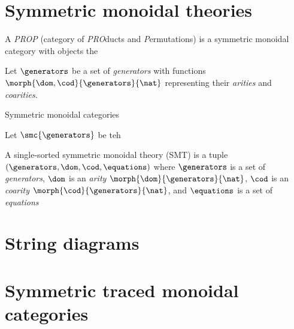 \section{Symmetric monoidal theories}

\begin{definition}
    A \emph{PROP} (category of \emph{PRO}ducts and \emph{P}ermutations) is a
    symmetric monoidal category with objects the
\end{definition}

\begin{definition}
    Let \(\generators\) be a set of \emph{generators} with functions \(
        \morph{\dom,\cod}{\generators}{\nat}
    \) representing their \emph{arities} and \emph{coarities}.
\end{definition}

Symmetric monoidal categories

\begin{definition}
    Let \(\smc{\generators}\) be teh


    A single-sorted symmetric monoidal theory (SMT) is a tuple \(
        (\generators, \dom, \cod, \equations)
    \) where \(\generators\) is a set of \emph{generators}, \(\dom\) is an
    \emph{arity} \(\morph{\dom}{\generators}{\nat}\), \(\cod\) is an
    \emph{coarity} \(\morph{\cod}{\generators}{\nat}\), and \(\equations\) is a
    set of \emph{equations}
\end{definition}

\section{String diagrams}

\section{Symmetric traced monoidal categories}